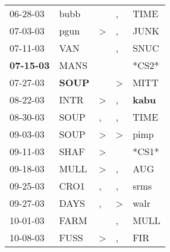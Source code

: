 \begin{supertabular}{p{0.07\textwidth}p{0.06\textwidth}p{0.02\textwidth}p{0.02\textwidth}p{0.06\textwidth}}
          06-28-03\textsuperscript{} &           bubb\textsuperscript{} &                  &                , &           TIME\textsuperscript{} \\
          07-03-03\textsuperscript{} &           pgun\textsuperscript{} &     \textgreater &                , &           JUNK\textsuperscript{} \\
          07-11-03\textsuperscript{} &            VAN\textsuperscript{} &                  &                , &           SNUC\textsuperscript{} \\
 \textbf{07-15-03\textsuperscript{}} &           MANS\textsuperscript{} &                  &                  &                            *CS2* \\
          07-27-03\textsuperscript{} &  \textbf{SOUP\textsuperscript{}} &                  &     \textgreater &           MITT\textsuperscript{} \\
          08-22-03\textsuperscript{} &           INTR\textsuperscript{} &     \textgreater &                , &  \textbf{kabu\textsuperscript{}} \\
          08-30-03\textsuperscript{} &           SOUP\textsuperscript{} &                , &                , &           TIME\textsuperscript{} \\
          09-03-03\textsuperscript{} &           SOUP\textsuperscript{} &     \textgreater &     \textgreater &           pimp\textsuperscript{} \\
          09-11-03\textsuperscript{} &           SHAF\textsuperscript{} &     \textgreater &                  &                            *CS1* \\
          09-18-03\textsuperscript{} &           MULL\textsuperscript{} &     \textgreater &                , &            AUG\textsuperscript{} \\
          09-25-03\textsuperscript{} &           CRO1\textsuperscript{} &                , &                , &           srms\textsuperscript{} \\
          09-27-03\textsuperscript{} &           DAYS\textsuperscript{} &                , &     \textgreater &           walr\textsuperscript{} \\
          10-01-03\textsuperscript{} &           FARM\textsuperscript{} &                  &                , &           MULL\textsuperscript{} \\
          10-08-03\textsuperscript{} &           FUSS\textsuperscript{} &     \textgreater &                , &            FIR\textsuperscript{} \\

\end{supertabular}
